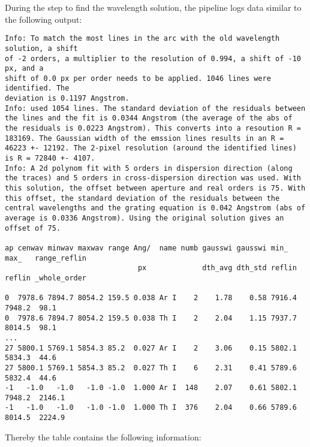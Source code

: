 \documentclass[10pt,a4paper]{article}
\begin{document}
During the step to find the wavelength solution, the pipeline logs data similar to the following output:
\begin{lstlisting}[style=base, basicstyle=\tiny]
Info: To match the most lines in the arc with the old wavelength solution, a shift
of -2 orders, a multiplier to the resolution of 0.994, a shift of -10 px, and a
shift of 0.0 px per order needs to be applied. 1046 lines were identified. The
deviation is 0.1197 Angstrom.
Info: used 1054 lines. The standard deviation of the residuals between the lines and the fit is 0.0344 Angstrom (the average of the abs of the residuals is 0.0223 Angstrom). This converts into a resoution R = 183169. The Gaussian width of the emssion lines results in an R = 46223 +- 12192. The 2-pixel resolution (around the identified lines) is R = 72840 +- 4107.
Info: A 2d polynom fit with 5 orders in dispersion direction (along the traces) and 5 orders in cross-dispersion direction was used. With this solution, the offset between aperture and real orders is 75. With this offset, the standard deviation of the residuals between the central wavelengths and the grating equation is 0.042 Angstrom (abs of average is 0.0336 Angstrom). Using the original solution gives an offset of 75.

ap cenwav minwav maxwav range Ang/  name numb gausswi gausswi min_   max_   range_reflin
                               px             dth_avg dth_std reflin reflin _whole_order

0  7978.6 7894.7 8054.2 159.5 0.038 Ar I    2    1.78    0.58 7916.4 7948.2  98.1
0  7978.6 7894.7 8054.2 159.5 0.038 Th I    2    2.04    1.15 7937.7 8014.5  98.1
...
27 5800.1 5769.1 5854.3 85.2  0.027 Ar I    2    3.06    0.15 5802.1 5834.3  44.6
27 5800.1 5769.1 5854.3 85.2  0.027 Th I    6    2.31    0.41 5789.6 5832.4  44.6
-1   -1.0   -1.0   -1.0 -1.0  1.000 Ar I  148    2.07    0.61 5802.1 7948.2  2146.1
-1   -1.0   -1.0   -1.0 -1.0  1.000 Th I  376    2.04    0.66 5789.6 8014.5  2224.9
\end{lstlisting} 
Thereby the table contains the following information:
\end{document}
